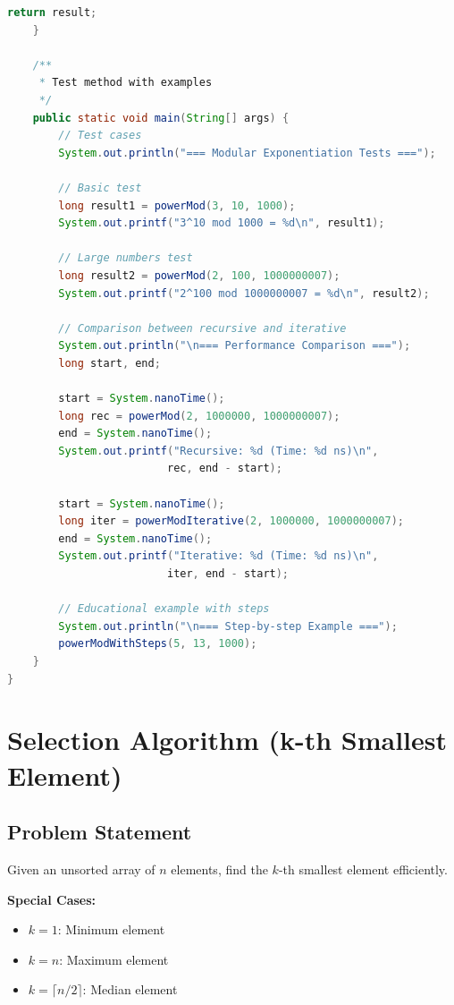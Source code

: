 \documentclass[12pt,a4paper]{article}
\begin{document}
\begin{lstlisting}[language=Java, caption=Modular Exponentiation Implementation]
        return result;
    }
    
    /**
     * Test method with examples
     */
    public static void main(String[] args) {
        // Test cases
        System.out.println("=== Modular Exponentiation Tests ===");
        
        // Basic test
        long result1 = powerMod(3, 10, 1000);
        System.out.printf("3^10 mod 1000 = %d\n", result1);
        
        // Large numbers test
        long result2 = powerMod(2, 100, 1000000007);
        System.out.printf("2^100 mod 1000000007 = %d\n", result2);
        
        // Comparison between recursive and iterative
        System.out.println("\n=== Performance Comparison ===");
        long start, end;
        
        start = System.nanoTime();
        long rec = powerMod(2, 1000000, 1000000007);
        end = System.nanoTime();
        System.out.printf("Recursive: %d (Time: %d ns)\n", 
                         rec, end - start);
        
        start = System.nanoTime();
        long iter = powerModIterative(2, 1000000, 1000000007);
        end = System.nanoTime();
        System.out.printf("Iterative: %d (Time: %d ns)\n", 
                         iter, end - start);
        
        // Educational example with steps
        System.out.println("\n=== Step-by-step Example ===");
        powerModWithSteps(5, 13, 1000);
    }
}
\end{lstlisting}

\newpage

\section{Selection Algorithm (k-th Smallest Element)}

\subsection{Problem Statement}
\begin{tcolorbox}[colback=purple!5!white,colframe=purple!50!black,title=\textbf{Selection Problem}]
Given an unsorted array of $n$ elements, find the $k$-th smallest element efficiently.

\textbf{Special Cases:}
\begin{itemize}
    \item $k = 1$: Minimum element
    \item $k = n$: Maximum element  
    \item $k = \lceil n/2 \rceil$: Median element
\end{itemize}
\end{tcolorbox}
\end{document}
